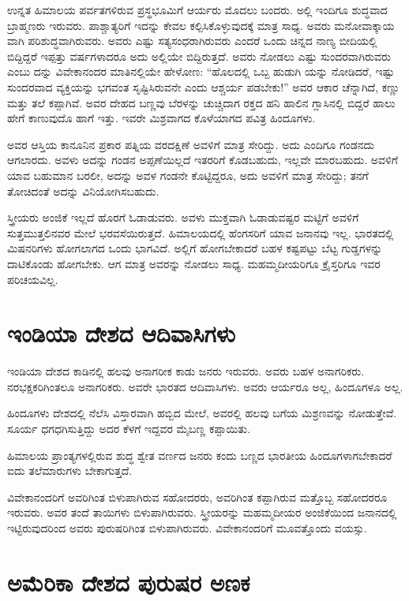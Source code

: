 ಉನ್ನತ ಹಿಮಾಲಯ ಪರ್ವತಗಳಿರುವ ಪ್ರಸ್ಥಭೂಮಿಗೆ ಆರ್ಯರು ಮೊದಲು ಬಂದರು. ಅಲ್ಲಿ ಇಂದಿಗೂ ಶುದ್ಧವಾದ ಬ್ರಾಹ್ಮಣರು ಇರುವರು. ಪಾಶ್ಚಾತ್ಯರಿಗೆ ಇದನ್ನು ಕೇವಲ ಕಲ್ಪಿಸಿಕೊಳ್ಳುವುದಕ್ಕೆ ಮಾತ್ರ ಸಾಧ್ಯ. ಅವರು ಮನೋವಾಕ್ಕಾಯ ವಾಗಿ ಪರಿಶುದ್ಧವಾಗಿರುವರು. ಅವರು ಎಷ್ಟು ಸತ್ಯಸಂಧರಾಗಿರುವರು ಎಂದರೆ ಒಂದು ಚಿನ್ನದ ನಾಣ್ಯ ಬೀದಿಯಲ್ಲಿ ಬಿದ್ದಿದ್ದರೆ ಇಪ್ಪತ್ತು ವರ್ಷಗಳಾದರೂ ಅದು ಅಲ್ಲಿಯೇ ಬಿದ್ದಿರುತ್ತದೆ. ಅವರು ನೋಡಲು ಎಷ್ಟು ಸುಂದರವಾಗಿರುವರು ಎಂಬು ದನ್ನು ವಿವೇಕಾನಂದರ ಮಾತಿನಲ್ಲಿಯೇ ಹೇಳೋಣ: “ಹೊಲದಲ್ಲಿ ಒಬ್ಬ ಹುಡುಗಿ ಯನ್ನು ನೋಡಿದರೆ, ಇಷ್ಟು ಸುಂದರವಾದ ವ್ಯಕ್ತಿಯನ್ನು ಭಗವಂತ ಸೃಷ್ಟಿಸಿರುವನೇ ಎಂದು ಆಶ್ಚರ್ಯ ಪಡಬೇಕು!” ಅವರ ಆಕಾರ ಚೆನ್ನಾಗಿದೆ, ಕಣ್ಣು ಮತ್ತು ತಲೆ ಕಪ್ಪಾಗಿವೆ. ಅವರ ದೇಹದ ಬಣ್ಣವು ಬೆರಳನ್ನು ಚುಚ್ಚಿದಾಗ ರಕ್ತದ ಹನಿ ಹಾಲಿನ ಗ್ಲಾಸಿನಲ್ಲಿ ಬಿದ್ದರೆ ಹಾಲು ಹೇಗೆ ಕಾಣುವುದೊ ಹಾಗೆ ಇತ್ತು. ಇವರೇ ಮಿಶ್ರವಾಗದ ಕೊಳೆಯಾಗದ ಪವಿತ್ರ ಹಿಂದೂಗಳು.

ಅವರ ಆಸ್ತಿಯ ಕಾನೂನಿನ ಪ್ರಕಾರ ಪತ್ನಿಯ ವರದಕ್ಷಿಣೆ ಅವಳಿಗೆ ಮಾತ್ರ ಸೇರಿದ್ದು. ಅದು ಎಂದಿಗೂ ಗಂಡನದು ಆಗಲಾರದು. ಅವಳು ಅದನ್ನು ಗಂಡನ ಅಪ್ಪಣೆಯಿಲ್ಲದೆ ಇತರರಿಗೆ ಕೊಡಬಹುದು, ಇಲ್ಲವೇ ಮಾರಬಹುದು. ಅವಳಿಗೆ ಯಾವ ಬಹುಮಾನ ಬರಲೀ, ಅದನ್ನು ಅವಳ ಗಂಡನೇ ಕೊಟ್ಟಿದ್ದರೂ, ಅದು ಅವಳಿಗೆ ಮಾತ್ರ ಸೇರಿದ್ದು; ತನಗೆ ತೋಚಿದಂತೆ ಅದನ್ನು ವಿನಿಯೋಗಿಸಬಹುದು.

ಸ್ತ್ರೀಯರು ಅಂಜಿಕೆ ಇಲ್ಲದೆ ಹೊರಗೆ ಓಡಾಡುವರು. ಅವಳು ಮುಕ್ತವಾಗಿ ಓಡಾಡುವಷ್ಟರ ಮಟ್ಟಿಗೆ ಅವಳಿಗೆ ಸುತ್ತಮುತ್ತಲಿನವರ ಮೇಲೆ ಭರವಸೆಯಿರುತ್ತದೆ. ಹಿಮಾಲಯದಲ್ಲಿ ಹೆಂಗಸರಿಗೆ ಯಾವ ಜನಾನವು ಇಲ್ಲ. ಭಾರತದಲ್ಲಿ ಮಿಷನರಿಗಳು ಹೋಗಲಾಗದ ಒಂದು ಭಾಗವಿದೆ. ಅಲ್ಲಿಗೆ ಹೋಗಬೇಕಾದರೆ ಬಹಳ ಕಷ್ಟಪಟ್ಟು ಬೆಟ್ಟ ಗುಡ್ಡಗಳನ್ನು ದಾಟಿಕೊಂಡು ಹೋಗಬೇಕು. ಆಗ ಮಾತ್ರ ಅವರನ್ನು ನೋಡಲು ಸಾಧ್ಯ. ಮಹಮ್ಮದೀಯರಿಗೂ ಕ್ರೈಸ್ತರಿಗೂ ಇವರ ಪರಿಚಯವಿಲ್ಲ.

\delimiter


\section{ಇಂಡಿಯಾ ದೇಶದ ಆದಿವಾಸಿಗಳು}

ಇಂಡಿಯಾ ದೇಶದ ಕಾಡಿನಲ್ಲಿ ಹಲವು ಅನಾಗರೀಕ ಕಾಡು ಜನರು ಇರುವರು. ಅವರು ಬಹಳ ಅನಾಗರಿಕರು. ನರಭಕ್ಷಕರಿಗಿಂತಲೂ ಅನಾಗರಿಕರು. ಅವರೇ ಭಾರತದ ಆದಿವಾಸಿಗಳು. ಅವರು ಆರ್ಯರೂ ಅಲ್ಲ, ಹಿಂದೂಗಳೂ ಅಲ್ಲ.

ಹಿಂದೂಗಳು ದೇಶದಲ್ಲಿ ನೆಲೆಸಿ ವಿಸ್ತಾರವಾಗಿ ಹಬ್ಬಿದ ಮೇಲೆ, ಅವರಲ್ಲಿ ಹಲವು ಬಗೆಯ ಮಿಶ್ರಣವನ್ನು ನೋಡುತ್ತೇವೆ. ಸೂರ್ಯ ಧಗಧಗಿಸುತ್ತಿದ್ದು ಅದರ ಕೆಳಗೆ ಇದ್ದವರ ಮೈಬಣ್ಣ ಕಪ್ಪಾಯಿತು.

ಹಿಮಾಲಯ ಪ್ರಾಂತ್ಯಗಳಲ್ಲಿರುವ ಶುದ್ಧ ಶ್ವೇತ ವರ್ಣದ ಜನರು ಕಂದು ಬಣ್ಣದ ಭಾರತೀಯ ಹಿಂದೂಗಳಾಗಬೇಕಾದರೆ ಐದು ತಲೆಮಾರುಗಳು ಬೇಕಾಗುತ್ತದೆ.

ವಿವೇಕಾನಂದರಿಗೆ ಅವರಿಗಿಂತ ಬಿಳುಪಾಗಿರುವ ಸಹೋದರರು, ಅವರಿಗಿಂತ ಕಪ್ಪಾಗಿರುವ ಮತ್ತೊಬ್ಬ ಸಹೋದರರೂ ಇರುವರು. ಅವರ ತಂದೆ ತಾಯಿಗಳು ಬಿಳುಪಾಗಿರುವರು. ಸ್ತ್ರೀಯರನ್ನು ಮಹಮ್ಮದೀಯರ ಅಂಜಿಕೆಯಿಂದ ಜನಾನದಲ್ಲಿ ಇಟ್ಟಿರುವುದರಿಂದ ಅವರು ಪುರುಷರಿಗಿಂತ ಬಿಳುಪಾಗಿರುವರು. ವಿವೇಕಾನಂದರಿಗೆ ಮೂವತ್ತೊಂದು ವಯಸ್ಸು.

\delimiter


\section{ಅಮೆರಿಕಾ ದೇಶದ ಪುರುಷರ ಅಣಕ}

